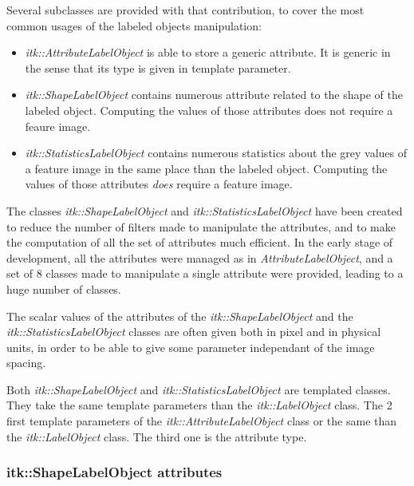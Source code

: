 \documentclass{InsightArticle}
\begin{document}
Several subclasses are provided with that contribution, to cover the most common
usages of the labeled objects manipulation:
\begin{itemize}
  \item {\em itk::AttributeLabelObject} is able to store a generic attribute. It
is generic in the sense that its type is given in template parameter.
  \item {\em itk::ShapeLabelObject} contains numerous attribute related to the
shape of the labeled object. Computing the values of those attributes does not
require a feaure image.
  \item {\em itk::StatisticsLabelObject} contains numerous statistics about the
grey values of a feature image in the same place than the labeled object.
Computing the values of those attributes {\em does} require a feature image.
\end{itemize}

The classes {\em itk::ShapeLabelObject} and {\em itk::StatisticsLabelObject} have been
created to reduce the number of filters made to manipulate the attributes, and to make
the computation of all the set of attributes much efficient. In the early stage of
development, all the attributes were managed as in {\em AttributeLabelObject}, and
a set of 8 classes made to manipulate a single attribute were provided, leading to a huge
number of classes.

The scalar values of the attributes of the {\em itk::ShapeLabelObject} and the
{\em itk::StatisticsLabelObject} classes are often given both in pixel and in physical units,
in order to be able to give some parameter independant of the image spacing.

Both {\em itk::ShapeLabelObject} and {\em itk::StatisticsLabelObject} are templated classes.
They take the same template parameters than the {\em itk::LabelObject} class.
The 2 first template parameters of the {\em itk::AttributeLabelObject} class or the same
than the {\em itk::LabelObject} class. The third one is the attribute type.

\subsubsection{itk::ShapeLabelObject attributes}
\end{document}
